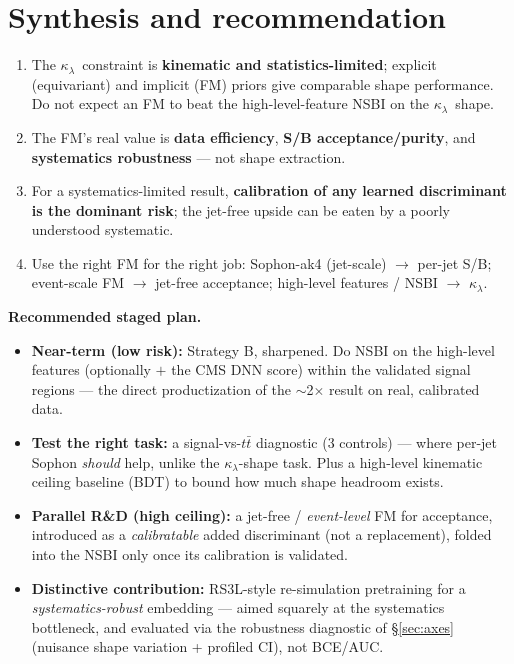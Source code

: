 \documentclass[11pt]{article}
\newcommand{\kl}{\ensuremath{\kappa_\lambda}}
\begin{document}
\section{Synthesis and recommendation}
\begin{takeaway}
\begin{enumerate}[leftmargin=1.4em]
\item The \kl\ constraint is \textbf{kinematic and statistics-limited}; explicit
  (equivariant) and implicit (FM) priors give comparable shape performance. Do not
  expect an FM to beat the high-level-feature NSBI on the \kl\ shape.
\item The FM's real value is \textbf{data efficiency}, \textbf{S/B acceptance/purity},
  and \textbf{systematics robustness} --- not shape extraction.
\item For a systematics-limited result, \textbf{calibration of any learned
  discriminant is the dominant risk}; the jet-free upside can be eaten by a poorly
  understood systematic.
\item Use the right FM for the right job: Sophon-ak4 (jet-scale) $\to$ per-jet S/B;
  event-scale FM $\to$ jet-free acceptance; high-level features / NSBI $\to$ \kl.
\end{enumerate}
\end{takeaway}

\noindent\textbf{Recommended staged plan.}
\begin{itemize}
\item \textbf{Near-term (low risk):} Strategy B, sharpened. Do NSBI on the high-level
  features (optionally $+$ the CMS DNN score) within the validated signal regions ---
  the direct productization of the $\sim$2$\times$ result on real, calibrated data.
\item \textbf{Test the right task:} a signal-vs-$t\bar t$ diagnostic (3 controls) ---
  where per-jet Sophon \emph{should} help, unlike the \kl-shape task. Plus a
  high-level kinematic ceiling baseline (BDT) to bound how much shape headroom exists.
\item \textbf{Parallel R\&D (high ceiling):} a jet-free / \emph{event-level} FM for
  acceptance, introduced as a \emph{calibratable} added discriminant (not a
  replacement), folded into the NSBI only once its calibration is validated.
\item \textbf{Distinctive contribution:} RS3L-style re-simulation pretraining for a
  \emph{systematics-robust} embedding --- aimed squarely at the systematics bottleneck,
  and evaluated via the robustness diagnostic of \S\ref{sec:axes} (nuisance shape
  variation + profiled CI), not BCE/AUC.
\end{itemize}
\end{document}
